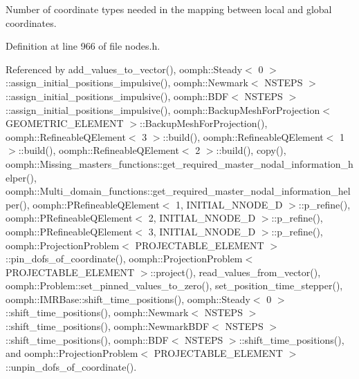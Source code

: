 Number of coordinate types needed in the mapping between local and global coordinates. 



Definition at line 966 of file nodes.\+h.



Referenced by add\+\_\+values\+\_\+to\+\_\+vector(), oomph\+::\+Steady$<$ 0 $>$\+::assign\+\_\+initial\+\_\+positions\+\_\+impulsive(), oomph\+::\+Newmark$<$ N\+S\+T\+E\+P\+S $>$\+::assign\+\_\+initial\+\_\+positions\+\_\+impulsive(), oomph\+::\+B\+D\+F$<$ N\+S\+T\+E\+P\+S $>$\+::assign\+\_\+initial\+\_\+positions\+\_\+impulsive(), oomph\+::\+Backup\+Mesh\+For\+Projection$<$ G\+E\+O\+M\+E\+T\+R\+I\+C\+\_\+\+E\+L\+E\+M\+E\+N\+T $>$\+::\+Backup\+Mesh\+For\+Projection(), oomph\+::\+Refineable\+Q\+Element$<$ 3 $>$\+::build(), oomph\+::\+Refineable\+Q\+Element$<$ 1 $>$\+::build(), oomph\+::\+Refineable\+Q\+Element$<$ 2 $>$\+::build(), copy(), oomph\+::\+Missing\+\_\+masters\+\_\+functions\+::get\+\_\+required\+\_\+master\+\_\+nodal\+\_\+information\+\_\+helper(), oomph\+::\+Multi\+\_\+domain\+\_\+functions\+::get\+\_\+required\+\_\+master\+\_\+nodal\+\_\+information\+\_\+helper(), oomph\+::\+P\+Refineable\+Q\+Element$<$ 1, I\+N\+I\+T\+I\+A\+L\+\_\+\+N\+N\+O\+D\+E\+\_\+D $>$\+::p\+\_\+refine(), oomph\+::\+P\+Refineable\+Q\+Element$<$ 2, I\+N\+I\+T\+I\+A\+L\+\_\+\+N\+N\+O\+D\+E\+\_\+D $>$\+::p\+\_\+refine(), oomph\+::\+P\+Refineable\+Q\+Element$<$ 3, I\+N\+I\+T\+I\+A\+L\+\_\+\+N\+N\+O\+D\+E\+\_\+D $>$\+::p\+\_\+refine(), oomph\+::\+Projection\+Problem$<$ P\+R\+O\+J\+E\+C\+T\+A\+B\+L\+E\+\_\+\+E\+L\+E\+M\+E\+N\+T $>$\+::pin\+\_\+dofs\+\_\+of\+\_\+coordinate(), oomph\+::\+Projection\+Problem$<$ P\+R\+O\+J\+E\+C\+T\+A\+B\+L\+E\+\_\+\+E\+L\+E\+M\+E\+N\+T $>$\+::project(), read\+\_\+values\+\_\+from\+\_\+vector(), oomph\+::\+Problem\+::set\+\_\+pinned\+\_\+values\+\_\+to\+\_\+zero(), set\+\_\+position\+\_\+time\+\_\+stepper(), oomph\+::\+I\+M\+R\+Base\+::shift\+\_\+time\+\_\+positions(), oomph\+::\+Steady$<$ 0 $>$\+::shift\+\_\+time\+\_\+positions(), oomph\+::\+Newmark$<$ N\+S\+T\+E\+P\+S $>$\+::shift\+\_\+time\+\_\+positions(), oomph\+::\+Newmark\+B\+D\+F$<$ N\+S\+T\+E\+P\+S $>$\+::shift\+\_\+time\+\_\+positions(), oomph\+::\+B\+D\+F$<$ N\+S\+T\+E\+P\+S $>$\+::shift\+\_\+time\+\_\+positions(), and oomph\+::\+Projection\+Problem$<$ P\+R\+O\+J\+E\+C\+T\+A\+B\+L\+E\+\_\+\+E\+L\+E\+M\+E\+N\+T $>$\+::unpin\+\_\+dofs\+\_\+of\+\_\+coordinate().

\mbox{\label{classoomph_1_1Node_a984b28f8b689a85a4060baba377b1c0a}} 
